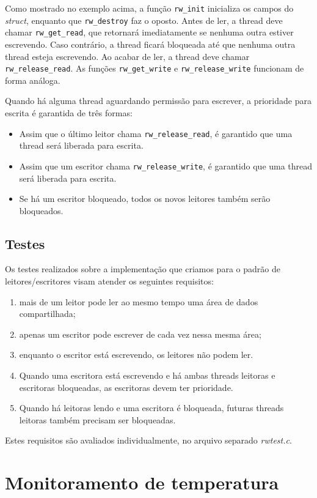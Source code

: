 \documentclass[12pt]{article}
\begin{document}
Como mostrado no exemplo acima,
a função \texttt{rw\_init}
inicializa os campos do \textit{struct},
enquanto que \texttt{rw\_destroy} faz o oposto.
Antes de ler,
a thread deve chamar \texttt{rw\_get\_read},
que retornará imediatamente
se nenhuma outra estiver escrevendo.
Caso contrário, a thread ficará bloqueada
até que nenhuma outra thread esteja escrevendo.
Ao acabar de ler,
a thread deve chamar \texttt{rw\_release\_read}.
As funções \texttt{rw\_get\_write} e \texttt{rw\_release\_write}
funcionam de forma análoga.

Quando há alguma thread aguardando permissão para escrever,
a prioridade para escrita é garantida de três formas:
\begin{itemize}
	\item Assim que o último leitor chama \texttt{rw\_release\_read},
		é garantido que uma thread será liberada para escrita.
	\item Assim que um escritor chama \texttt{rw\_release\_write},
		é garantido que uma thread será liberada para escrita.
	\item Se há um escritor bloqueado, todos os novos leitores
		também serão bloqueados.
\end{itemize}

\newpage
\subsection{Testes}

Os testes realizados sobre a implementação que criamos
para o padrão de leitores/escritores visam atender
os seguintes requisitos:
\begin{enumerate}
\item mais de um leitor pode ler ao mesmo tempo
uma área de dados compartilhada;
\item apenas um escritor pode escrever
de cada vez nessa mesma área;
\item enquanto o escritor está escrevendo,
os leitores não podem ler.
\item Quando uma escritora está escrevendo e
há ambas threads leitoras e escritoras bloqueadas,
as escritoras devem ter prioridade.
\item Quando há leitoras lendo e uma escritora
é bloqueada, futuras threads leitoras
também precisam ser bloqueadas.
\end{enumerate}
Estes requisitos são avaliados individualmente,
no arquivo separado \textit{rwtest.c}.

\section{Monitoramento de temperatura}
\end{document}
